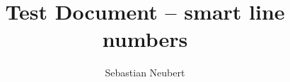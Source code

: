 \documentclass[12pt]{article}
\begin{document}

\title{Test Document -- smart line numbers}
\author{Sebastian Neubert}
\date{}
\maketitle
\thispagestyle{empty}
\pagestyle{empty}

\blindtext
\end{document}
